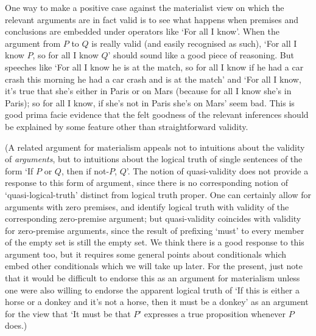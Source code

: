 \documentclass[If.tex]{subfiles}
\begin{document}
One way to make a positive case against the materialist view on which the relevant arguments are in fact valid is to see what happens when premises and conclusions are embedded under operators like ‘For all I know’. When the argument from $P$ to $Q$ is really valid (and easily recognised as such), ‘For all I know $P$, so for all I know $Q$’ should sound like a good piece of reasoning. But speeches like ‘For all I know he is at the match, so for all I know if he had a car crash this morning he had a car crash and is at the match’ and ‘For all I know, it's true that she's either in Paris or on Mars (because for all I know she's in Paris); so for all I know, if she's not in Paris she's on Mars’ seem bad. This is good prima facie evidence that the felt goodness of the relevant inferences should be explained by some feature other than straightforward validity.

(A related argument for materialism appeals not to intuitions about the validity of \emph{arguments}, but to intuitions about the logical truth of single sentences of the form ‘If $P$ or $Q$, then if not-$P$, $Q$’. The notion of quasi-validity does not provide a response to this form of argument, since there is no corresponding notion of ‘quasi-logical-truth’ distinct from logical truth proper.  One can certainly allow for arguments with zero premises, and identify logical truth with validity of the corresponding zero-premise argument; but quasi-validity coincides with validity for zero-premise arguments, since the result of prefixing ‘must’ to every member of the empty set is still the empty set.  We think there is a good response to this argument too, but it requires some general points about conditionals which embed other conditionals which we will take up later.  
For the present, just note that it would be difficult to endorse this as an argument for materialism unless one were also willing to endorse the apparent logical truth of ‘If this is either a horse or a donkey and it's not a horse, then it must be a donkey’ as an argument for the view that ‘It must be that $P$’ expresses a true proposition whenever $P$ does.)
\end{document}
